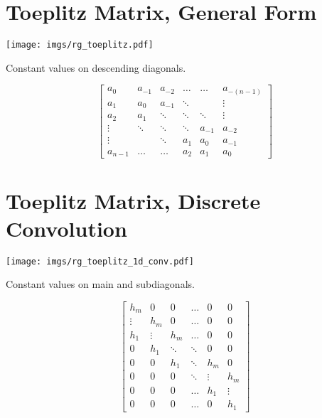 \section{Toeplitz Matrix, General Form}

\begin{center}
\texttt{[image: imgs/rg\_toeplitz.pdf]}
\end{center}


Constant values on descending diagonals.

\begin{equation}
\begin{bmatrix}
  a_{0} & a_{-1} & a_{-2} & \ldots  & \ldots & a_{-(n-1)}  \\
  a_{1} & a_0    & a_{-1} & \ddots  &        & \vdots \\
  a_{2} & a_{1}  & \ddots & \ddots  & \ddots & \vdots \\ 
 \vdots & \ddots & \ddots & \ddots  & a_{-1} & a_{-2}\\
 \vdots &        & \ddots & a_{1}   & a_{0}  & a_{-1} \\
a_{n-1} & \ldots & \ldots & a_{2}   & a_{1}  & a_{0}
\end{bmatrix}
\end{equation}


\section{Toeplitz Matrix, Discrete Convolution}

\begin{center}
\texttt{[image: imgs/rg\_toeplitz\_1d\_conv.pdf]}
\end{center}

Constant values on main and subdiagonals.

\begin{equation}
\begin{bmatrix}
  h_m &   0 &   0 &      \hdots &   0 &   0 \\
  \vdots & h_m &   0 &   \hdots &   0 &   0 \\
  h_1 & \vdots & h_m &   \hdots &   0 &   0 \\
    0 & h_1 & \ddots & \ddots &   0 &   0 \\
    0 &   0 & h_1 &    \ddots & h_m &   0 \\
    0 &   0 &   0 &    \ddots & \vdots & h_m \\
    0 &   0 &   0 &      \hdots & h_1 & \vdots \\
    0 &   0 &   0 &      \hdots &   0 & h_1 
\end{bmatrix}
\end{equation}


